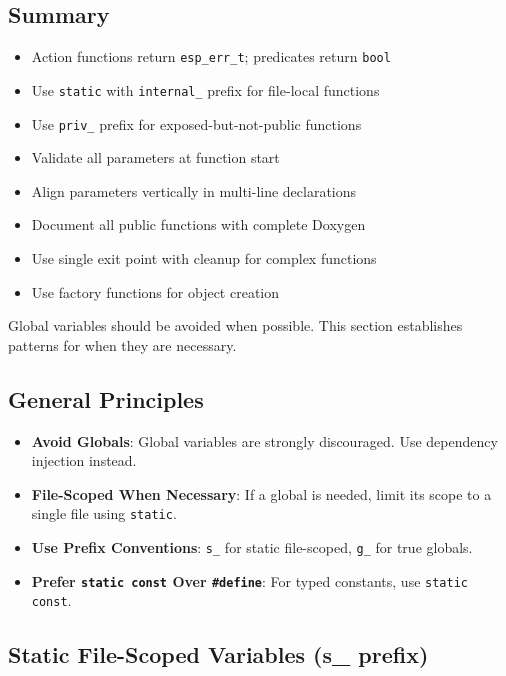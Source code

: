 \subsection{Summary}

\begin{itemize}
    \item Action functions return \texttt{esp\_err\_t}; predicates return \texttt{bool}
    \item Use \texttt{static} with \texttt{internal\_} prefix for file-local functions
    \item Use \texttt{priv\_} prefix for exposed-but-not-public functions
    \item Validate all parameters at function start
    \item Align parameters vertically in multi-line declarations
    \item Document all public functions with complete Doxygen
    \item Use single exit point with cleanup for complex functions
    \item Use factory functions for object creation
\end{itemize}



Global variables should be avoided when possible. This section establishes patterns for when they are necessary.

\subsection{General Principles}

\begin{itemize}
    \item \textbf{Avoid Globals}: Global variables are strongly discouraged. Use dependency injection instead.
    \item \textbf{File-Scoped When Necessary}: If a global is needed, limit its scope to a single file using \texttt{static}.
    \item \textbf{Use Prefix Conventions}: \texttt{s\_} for static file-scoped, \texttt{g\_} for true globals.
    \item \textbf{Prefer \texttt{static const} Over \texttt{\#define}}: For typed constants, use \texttt{static const}.
\end{itemize}

\subsection{Static File-Scoped Variables (s\_ prefix)}

